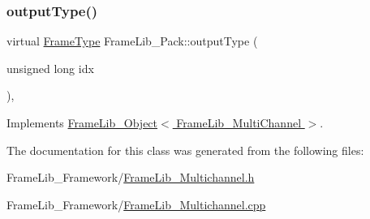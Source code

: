 \subsubsection{\texorpdfstring{output\+Type()}{outputType()}}
{\footnotesize\ttfamily virtual \hyperlink{_frame_lib___types_8h_ad495a9f61af7fff07d7e97979d1ab854}{Frame\+Type} Frame\+Lib\+\_\+\+Pack\+::output\+Type (\begin{DoxyParamCaption}\item[{unsigned long}]{idx }\end{DoxyParamCaption})\hspace{0.3cm}{\ttfamily [inline]}, {\ttfamily [virtual]}}



Implements \hyperlink{class_frame_lib___object_abdfca6b259f5fc7f97f4f2e016c1d80f}{Frame\+Lib\+\_\+\+Object$<$ Frame\+Lib\+\_\+\+Multi\+Channel $>$}.



The documentation for this class was generated from the following files\+:\begin{DoxyCompactItemize}
\item 
Frame\+Lib\+\_\+\+Framework/\hyperlink{_frame_lib___multichannel_8h}{Frame\+Lib\+\_\+\+Multichannel.\+h}\item 
Frame\+Lib\+\_\+\+Framework/\hyperlink{_frame_lib___multichannel_8cpp}{Frame\+Lib\+\_\+\+Multichannel.\+cpp}\end{DoxyCompactItemize}
